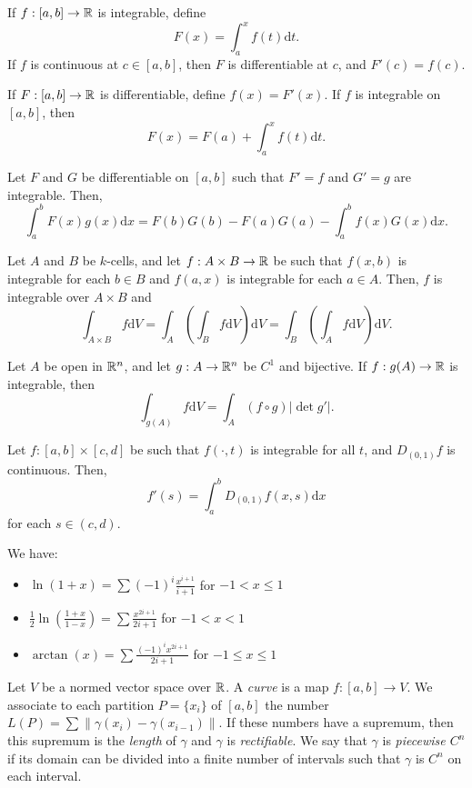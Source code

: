 \begin{thm}
    If $f:[a,b]\to\mathbb{R}$ is integrable, define
    \[F(x)=\int_a^x f(t)\mathrm dt.\]
    If $f$ is continuous at $c\in[a,b]$, then $F$ is differentiable at $c$, and
    $F'(c)=f(c)$.

    If $F:[a,b]\to\mathbb{R}$ is differentiable, define $f(x)=F'(x)$. If $f$ is
    integrable on $[a,b]$, then \[F(x)=F(a)+\int_a^x f(t)\mathrm dt.\]
\end{thm}
\begin{thm}
    Let $F$ and $G$ be differentiable on $[a,b]$ such that $F'=f$ and $G'=g$ are
    integrable. Then,
    \[\int_a^b F(x)g(x)\mathrm dx=F(b)G(b)-F(a)G(a)-\int_a^b f(x)G(x)\mathrm
    dx.\]
\end{thm}
\begin{thm}[Fubini]
    Let $A$ and $B$ be $k$-cells, and let $f:A\times B\to\mathbb{R}$ be such that
    $f(x,b)$ is integrable for each $b\in B$ and $f(a,x)$ is integrable for each
    $a\in A$. Then, $f$ is integrable over $A\times B$ and
    \[\int_{A\times B}f\mathrm dV=\int_A\left(\int_B f\mathrm dV\right)\mathrm
    dV=\int_B\left(\int_A f\mathrm dV\right)\mathrm dV.\]
\end{thm}
\begin{thm}
    Let $A$ be open in $\mathbb{R}^n$, and let $g:A\to\mathbb{R}^n$ be $C^1$ and bijective.
    If $f:g(A)\to\mathbb{R}$ is integrable, then
    \[\int_{g(A)}f\mathrm dV=\int_A(f\circ g)|\det g'|.\]
\end{thm}
\begin{thm}
    Let $f:[a,b]\times[c,d]$ be such that $f(\cdot,t)$
    is integrable for all $t$, and $D_{(0,1)}f$ is continuous. Then, 
    \[f'(s)=\int_a^b D_{(0,1)}f(x,s)\mathrm dx\]
    for each $s\in(c,d)$.
\end{thm}
\begin{prop}
    We have:
    \begin{itemize}
        \item $\ln(1+x)=\sum (-1)^i\frac{x^{i+1}}{i+1}$ for $-1<x\le 1$
        \item $\frac12\ln\left(\frac{1+x}{1-x}\right)=\sum
            \frac{x^{2i+1}}{2i+1}$ for $-1<x<1$
        \item $\arctan(x)=\sum \frac{(-1)^i x^{2i+1}}{2i+1}$ for $-1\le x\le 1$
    \end{itemize}
\end{prop}
\begin{defn}
    Let $V$ be a normed vector space over $\mathbb{R}$. A \emph{curve} is a map $f:[a,b]\to
    V$. We associate to each partition $P=\{x_i\}$ of $[a,b]$ the number
    $L(P)=\sum\|\gamma(x_i)-\gamma(x_{i-1})\|$. If these numbers have a
    supremum, then this supremum is the \emph{length} of $\gamma$ and $\gamma$
    is \emph{rectifiable}. We say that $\gamma$ is \emph{piecewise $C^n$} if
    its domain can be divided into a finite number of intervals such that
    $\gamma$ is $C^n$ on each interval.
\end{defn}
